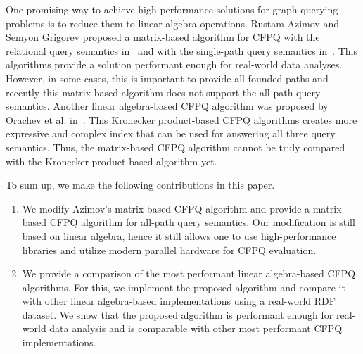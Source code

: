 One promising way to achieve high-performance solutions for graph querying problems is to reduce them to linear algebra operations. Rustam Azimov and Semyon Grigorev proposed a matrix-based algorithm for CFPQ with the relational query semantics in~\cite{Azimov:2018:CPQ:3210259.3210264} and with the single-path query semantics in~\cite{10.1145/3398682.3399163}.
This algorithms provide a solution performant enough for real-world data analyses.
However, in some cases, this is important to provide all founded paths and recently this matrix-based algorithm does not support the all-path query semantics. Another linear algebra-based CFPQ algorithm was proposed by Orachev et al. in~\cite{kron}. This Kronecker product-based CFPQ algorithms creates more expressive and complex index that can be used for answering all three query semantics. Thus, the matrix-based CFPQ algorithm cannot be truly compared with the Kronecker product-based algorithm yet.

To sum up, we make the following contributions in this paper.
\begin{enumerate}
	\item We modify Azimov's matrix-based CFPQ algorithm and provide a matrix-based CFPQ algorithm for all-path query semantics.
	Our modification is still based on linear algebra, hence it still allows one to use high-performance libraries and utilize modern parallel hardware for CFPQ evaluation.
	\item We provide a comparison of the most performant linear algebra-based CFPQ algorithms. For this, we implement the proposed algorithm and compare it with other linear algebra-based implementations using a real-world RDF dataset. We show that the proposed algorithm is performant enough for real-world data analysis and is comparable with other most performant CFPQ implementations.
\end{enumerate}